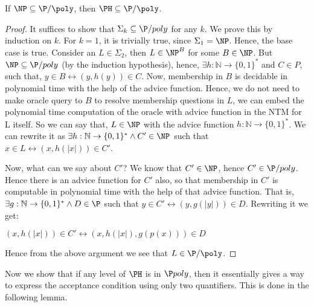 \begin{lemma}
 If $\NP \subseteq \P/\poly$, then $\PH \subseteq \P/\poly$.
\end{lemma}
\begin{proof}
It suffices to show that $\Sigma_{k} \subseteq \P/poly$ for any $k$. We prove this by induction on $k$.
For $k = 1$, it is trivially true, since $\Sigma_{1} = \NP$. Hence, the base case is true. Consider
an $L \in \Sigma_{2}$, then $L \in \NP^{B}$ for some $B \in \NP$. But $\NP \subseteq \P/poly$ (by
the induction hypothesis), hence, $\exists h : \mathbb{N} \rightarrow \{0, 1\}^*$ and $C \in P$,
such that, $y \in B \leftrightarrow  (y, h(y)) \in C$. Now, membership in $B$ is decidable in
polynomial time with the help of the advice function. Hence, we do not need to make oracle query to
$B$ to resolve membership questions in $L$, we can embed the polynomial time computation of the
oracle with advice function in the NTM for L itself. So we can say that, $L \in \NP$ with the advice
function $h : \mathbb{N} \rightarrow \{0, 1\}^*$. We can rewrite it as $\exists h : \mathbb{N}
\rightarrow \{0, 1\}^* \wedge C' \in \NP$ such that  $x \in L \leftrightarrow (x, h(|x|)) \in C'$.

Now, what can we say about $C'$? We know that $C' \in \NP$, hence $C' \in \P/poly$. Hence there is
an advice function for $C'$ also, so that membership in $C'$ is computable in polynomial time with
the help of that advice function. That is, $\exists g : \mathbb{N} \rightarrow \{0, 1\}^* \wedge D
\in \P$ such that  $y \in C' \leftrightarrow (y, g(|y|)) \in D$. Rewriting it we get:

\begin{center}
\begin{math}
 (x, h(|x|)) \in C' \leftrightarrow (x, h(|x|), g(p(x))) \in D
\end{math}
\end{center}

Hence from the above argument we see that $L \in \P/\poly$.
\end{proof}

Now we show that if any level of $\PH$ is in $\P\/poly$, then it essentially gives a way to express the acceptance condition using only two quantifiers. This is done in the following lemma.

